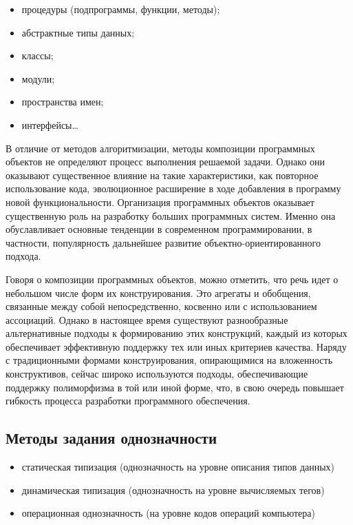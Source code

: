 \begin{itemize}
    \item процедуры (подпрограммы, функции, методы);
    \item абстрактные типы данных;
    \item классы;
    \item модули;
    \item пространства имен;
    \item интерфейсы…
\end{itemize}

В отличие от методов алгоритмизации, методы композиции программных объектов не определяют процесс выполнения решаемой задачи. Однако они оказывают существенное влияние на такие характеристики, как повторное использование кода, эволюционное расширение в ходе добавления в программу новой функциональности. Организация программных объектов оказывает существенную роль на разработку больших программных систем. Именно она обуславливает основные тенденции в современном программировании, в частности, популярность дальнейшее развитие объектно-ориентированного подхода.

Говоря о композиции программных объектов, можно отметить, что речь идет о небольшом числе форм их конструирования. Это агрегаты и обобщения, связанные между собой непосредственно, косвенно или с использованием ассоциаций. Однако в настоящее время существуют разнообразные альтернативные подходы к формированию этих конструкций, каждый из которых обеспечивает эффективную поддержку тех или иных критериев качества. Наряду с традиционными формами конструирования, опирающимися на вложенность конструктивов, сейчас широко используются подходы, обеспечивающие поддержку полиморфизма в той или иной форме, что, в свою очередь повышает гибкость процесса разработки программного обеспечения.


\subsection{Методы задания однозначности}

\begin{itemize}
    \item статическая типизация (однозначность на уровне описания типов данных)
    \item динамическая типизация (однозначность на уровне вычисляемых тегов)
    \item операционная однозначность (на уровне кодов операций компьютера)
\end{itemize}


